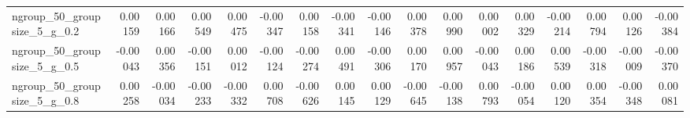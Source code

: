\documentclass[10pt, a4paper, titlepage]{article}
\begin{document}
\begin{landscape}
\begin{table}[]
{\begin{tabular}{l|rrrr|rrrr|rrrr|rrrr}
ngroup\_50\_groupsize\_5\_g\_0.2  & 0.00159                           & 0.00166                            & 0.00549                            & 0.00475                                 & -0.00347                          & 0.00158                            & -0.00341                           & -0.00146                                & 0.00378                           & 0.00990                            & 0.00002                            & 0.00329                                 & -0.00214                          & 0.00794                            & 0.00126                            & -0.00384                               \\
ngroup\_50\_groupsize\_5\_g\_0.5  & -0.00043                          & 0.00356                            & -0.00151                           & 0.00012                                 & -0.00124                          & -0.00274                           & 0.00491                            & -0.00306                                & 0.00170                           & 0.00957                            & -0.00043                           & 0.00186                                 & 0.00539                           & -0.00318                           & -0.00009                           & -0.00370                               \\
ngroup\_50\_groupsize\_5\_g\_0.8  & 0.00258                           & -0.00034                           & -0.00233                           & -0.00332                                & 0.00708                           & -0.00626                           & 0.00145                            & 0.00129                                 & -0.00645                          & -0.00138                           & 0.00793                            & -0.00054                                & 0.00120                           & 0.00354                            & -0.00348                           & 0.00081
\end{tabular}%
}
\end{table}
\end{landscape}

\newpage


\end{document}
